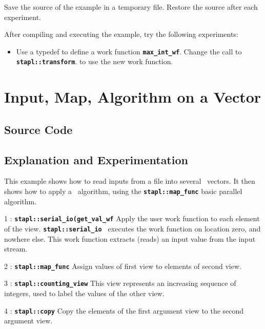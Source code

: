 \documentclass{report}
\begin{document}
Save the source of the example in a temporary file.
Restore the source after each experiment.

After compiling and executing the example, try the following experiments:
\begin{itemize}
\item
Use a typedef to define a work function
\texttt{{\bf max\_int\_wf}}.
Change the call to
\texttt{{\bf stapl::transform}}.
to use the new work function.
\end{itemize}


\pagebreak
\section{Input, Map, Algorithm on a Vector}

\subsection{Source Code}



\subsection{Explanation and Experimentation}

This example shows how to read inputs from a file into several \stapl\
vectors.  It then shows how to apply a \stapl\ algorithm, using the
\texttt{{\bf stapl::map\_func}}
basic parallel algorithm.

\begin{hashitemize}
\item 1 : \texttt{{\bf stapl::serial\_io(get\_val\_wf}}
\newline
Apply the user work function to each element of the view.
\texttt{{\bf stapl::serial\_io }}
executes the work function on location zero, and nowhere else.
This work function extracts (reads) an input value from the input stream.

\item 2 : \texttt{{\bf stapl::map\_func}}
\newline
Assign values of first view to elements of second view.

\item 3 : \texttt{{\bf stapl::counting\_view}}
\newline
This view represents an increasing sequence of integers, used to label
the values of the other view.

\item 4 : \texttt{{\bf stapl::copy}}
\newline
Copy the elements of the first argument view to the second argument view.

\end{hashitemize}
\end{document}
